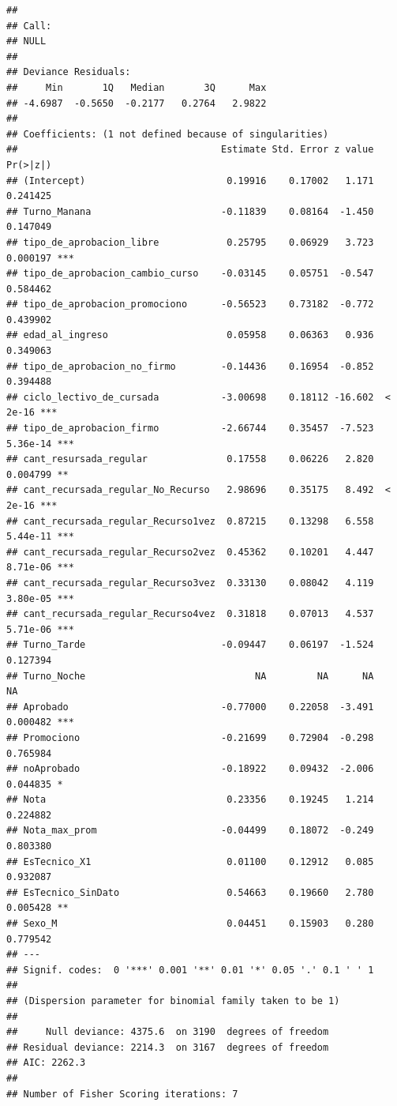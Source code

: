 \documentclass[]{article}
\begin{document}
\begin{lstlisting}
## 
## Call:
## NULL
## 
## Deviance Residuals: 
##     Min       1Q   Median       3Q      Max  
## -4.6987  -0.5650  -0.2177   0.2764   2.9822  
## 
## Coefficients: (1 not defined because of singularities)
##                                    Estimate Std. Error z value Pr(>|z|)    
## (Intercept)                         0.19916    0.17002   1.171 0.241425    
## Turno_Manana                       -0.11839    0.08164  -1.450 0.147049    
## tipo_de_aprobacion_libre            0.25795    0.06929   3.723 0.000197 ***
## tipo_de_aprobacion_cambio_curso    -0.03145    0.05751  -0.547 0.584462    
## tipo_de_aprobacion_promociono      -0.56523    0.73182  -0.772 0.439902    
## edad_al_ingreso                     0.05958    0.06363   0.936 0.349063    
## tipo_de_aprobacion_no_firmo        -0.14436    0.16954  -0.852 0.394488    
## ciclo_lectivo_de_cursada           -3.00698    0.18112 -16.602  < 2e-16 ***
## tipo_de_aprobacion_firmo           -2.66744    0.35457  -7.523 5.36e-14 ***
## cant_resursada_regular              0.17558    0.06226   2.820 0.004799 ** 
## cant_recursada_regular_No_Recurso   2.98696    0.35175   8.492  < 2e-16 ***
## cant_recursada_regular_Recurso1vez  0.87215    0.13298   6.558 5.44e-11 ***
## cant_recursada_regular_Recurso2vez  0.45362    0.10201   4.447 8.71e-06 ***
## cant_recursada_regular_Recurso3vez  0.33130    0.08042   4.119 3.80e-05 ***
## cant_recursada_regular_Recurso4vez  0.31818    0.07013   4.537 5.71e-06 ***
## Turno_Tarde                        -0.09447    0.06197  -1.524 0.127394    
## Turno_Noche                              NA         NA      NA       NA    
## Aprobado                           -0.77000    0.22058  -3.491 0.000482 ***
## Promociono                         -0.21699    0.72904  -0.298 0.765984    
## noAprobado                         -0.18922    0.09432  -2.006 0.044835 *  
## Nota                                0.23356    0.19245   1.214 0.224882    
## Nota_max_prom                      -0.04499    0.18072  -0.249 0.803380    
## EsTecnico_X1                        0.01100    0.12912   0.085 0.932087    
## EsTecnico_SinDato                   0.54663    0.19660   2.780 0.005428 ** 
## Sexo_M                              0.04451    0.15903   0.280 0.779542    
## ---
## Signif. codes:  0 '***' 0.001 '**' 0.01 '*' 0.05 '.' 0.1 ' ' 1
## 
## (Dispersion parameter for binomial family taken to be 1)
## 
##     Null deviance: 4375.6  on 3190  degrees of freedom
## Residual deviance: 2214.3  on 3167  degrees of freedom
## AIC: 2262.3
## 
## Number of Fisher Scoring iterations: 7
\end{lstlisting}
\end{document}
